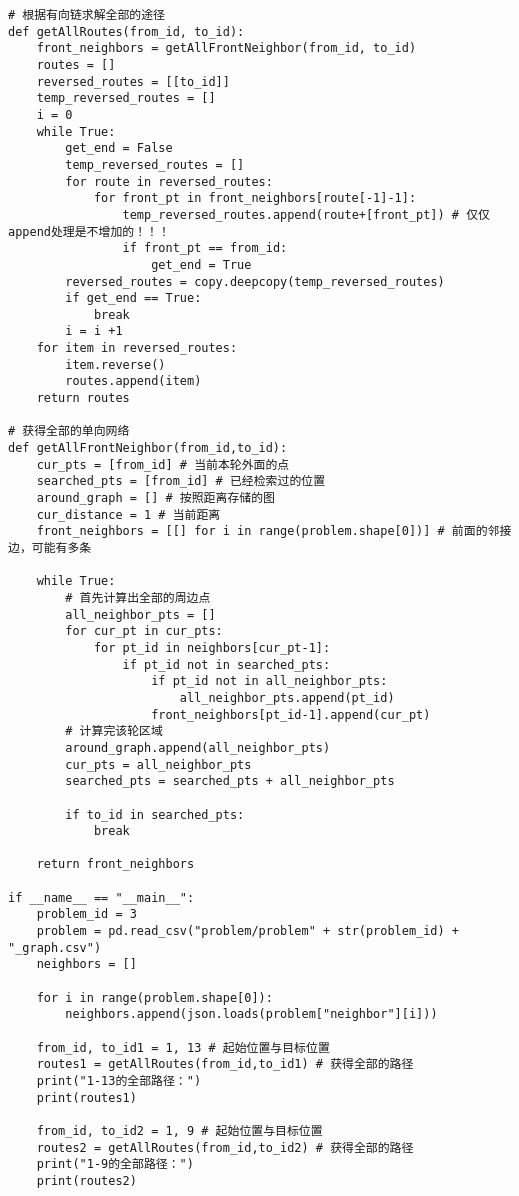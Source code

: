 \documentclass[bwprint]{cumcmthesis} %
\begin{document}
\begin{appendices}
\begin{lstlisting}
# 根据有向链求解全部的途径
def getAllRoutes(from_id, to_id):
    front_neighbors = getAllFrontNeighbor(from_id, to_id)
    routes = []
    reversed_routes = [[to_id]]
    temp_reversed_routes = []
    i = 0
    while True:
        get_end = False
        temp_reversed_routes = []
        for route in reversed_routes:
            for front_pt in front_neighbors[route[-1]-1]:
                temp_reversed_routes.append(route+[front_pt]) # 仅仅append处理是不增加的！！！
                if front_pt == from_id:
                    get_end = True
        reversed_routes = copy.deepcopy(temp_reversed_routes)
        if get_end == True:
            break
        i = i +1 
    for item in reversed_routes:
        item.reverse()
        routes.append(item)
    return routes
    
# 获得全部的单向网络
def getAllFrontNeighbor(from_id,to_id):
    cur_pts = [from_id] # 当前本轮外面的点
    searched_pts = [from_id] # 已经检索过的位置
    around_graph = [] # 按照距离存储的图
    cur_distance = 1 # 当前距离
    front_neighbors = [[] for i in range(problem.shape[0])] # 前面的邻接边，可能有多条
    
    while True:
        # 首先计算出全部的周边点
        all_neighbor_pts = []
        for cur_pt in cur_pts:
            for pt_id in neighbors[cur_pt-1]:
                if pt_id not in searched_pts:
                    if pt_id not in all_neighbor_pts:
                        all_neighbor_pts.append(pt_id)
                    front_neighbors[pt_id-1].append(cur_pt)
        # 计算完该轮区域
        around_graph.append(all_neighbor_pts)
        cur_pts = all_neighbor_pts
        searched_pts = searched_pts + all_neighbor_pts
    
        if to_id in searched_pts:
            break
    
    return front_neighbors
    
if __name__ == "__main__":
    problem_id = 3
    problem = pd.read_csv("problem/problem" + str(problem_id) + "_graph.csv")
    neighbors = []
    
    for i in range(problem.shape[0]):
        neighbors.append(json.loads(problem["neighbor"][i]))
    
    from_id, to_id1 = 1, 13 # 起始位置与目标位置
    routes1 = getAllRoutes(from_id,to_id1) # 获得全部的路径
    print("1-13的全部路径：")
    print(routes1)
        
    from_id, to_id2 = 1, 9 # 起始位置与目标位置
    routes2 = getAllRoutes(from_id,to_id2) # 获得全部的路径
    print("1-9的全部路径：")
    print(routes2)
    

\end{lstlisting}
\end{appendices}
\end{document}
